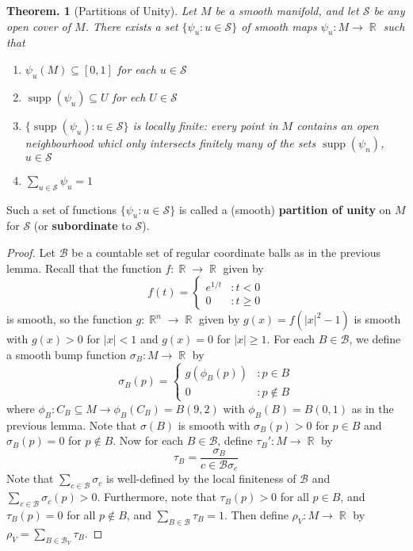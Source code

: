 \documentclass[11pt, a4paper]{memoir}
\DeclareMathOperator{\R}{{\mathbb{R}}}
\theoremstyle{change}
\newtheorem{theorem}{Theorem.}[section]
\theoremstyle{plain}
\theoremstyle{nonumberplain}
\newtheorem{proof}{Proof}
\DeclareMathOperator{\supp}{supp}
\numberwithin{equation}{section}
\begin{document}
\begin{theorem}[Partitions of Unity]
    Let $M$ be a smooth manifold, and let $\mathcal{S}$ be any open cover of $M$.
    There exists a set $\{\psi_u:u\in\mathcal{S}\}$ of smooth maps $\psi_u:M\to\R$ such that
    \begin{enumerate}[nl]
        \item $\psi_u(M)\subseteq[0,1]$ for each $u\in\mathcal{S}$
        \item $\supp(\psi_u)\subseteq U$ for ech $U\in\mathcal{S}$
        \item $\{\supp(\psi_u):u\in\mathcal{S}\}$ is locally finite: every point in $M$ contains an open neighbourhood whicl only intersects finitely many of the sets $\supp(\psi_n)$, $u\in\mathcal{S}$
        \item $\sum_{u\in\mathcal{S}}\psi_u=1$
    \end{enumerate}
\end{theorem}
Such a set of functions $\{\psi_u:u\in\mathcal{S}\}$ is called a (smooth) \textbf{partition of unity} on $M$ for $\mathcal{S}$ (or \textbf{subordinate} to $\mathcal{S}$).
\begin{proof}
    Let $\mathcal{B}$ be a countable set of regular coordinate balls as in the previous lemma.
    Recall that the function $f:\R\to\R$ given by
    \begin{equation*}
        f(t)=
        \begin{cases}
            e^{1/t} &: t<0\\
            0 &: t\geq 0
        \end{cases}
    \end{equation*}
    is smooth, so the function $g:\R^n\to\R$ given by $g(x)=f(|x|^2-1)$ is smooth with $g(x)>0$ for $|x|<1$ and $g(x)=0$ for $|x|\geq 1$.
    For each $B\in\mathcal{B}$, we define a smooth bump function $\sigma_B:M\to\R$ by
    \begin{equation*}
        \sigma_B(p)=
        \begin{cases}
            g(\phi_B(p)) &: p\in B\\
            0 &: p\notin B
        \end{cases}
    \end{equation*}
    where $\phi_B:C_B\subseteq M\to\phi_B(C_B)=B(9,2)$ with $\phi_B(B)=B(0,1)$ as in the previous lemma.
    Note that $\sigma(B)$ is smooth with $\sigma_B(p)>0$ for $p\in B$ and $\sigma_B(p)=0$ for $p\notin B$.
    Now for each $B\in\mathcal{B}$, define $\tau_B':M\to\R$ by
    \begin{equation*}
        \tau_B=\frac{\sigma_B}{c\in\mathcal{B}\sigma_c}
    \end{equation*}
    Note that $\sum_{c\in\mathcal{B}}\sigma_c$ is well-defined by the local finiteness of $\mathcal{B}$ and $\sum_{c\in\mathcal{B}}\sigma_c(p)>0$.
    Furthermore, note that $\tau_B(p)>0$ for all $p\in B$, and $\tau_B(p)=0$ for all $p\notin B$, and $\sum_{B\in\mathcal{B}}\tau_B=1$.
    Then define $\rho_V:M\to\R$ by $\rho_V=\sum_{B\in\mathcal{B}_V}\tau_B$.
\end{proof}
\end{document}
